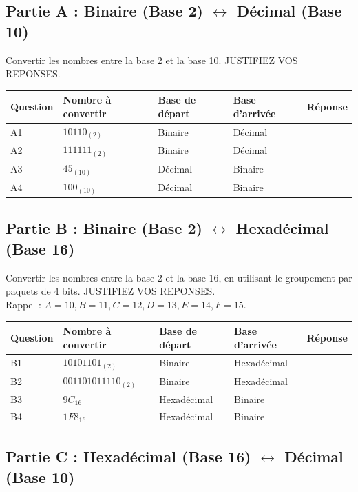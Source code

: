 \begin{Exercise}[title={Conversions de Bases Numériques}]
\subsection*{Partie A : Binaire (Base 2) $\leftrightarrow$ Décimal (Base 10)}
\Question Convertir les nombres entre la base 2 et la base 10. JUSTIFIEZ VOS REPONSES.\\[0.2cm]
\begin{tabular}{|l|l|l|l|l|}
    \hline
        Question & Nombre à convertir & Base de départ & Base d'arrivée & Réponse \\ \hline
        A1 & ${10110}_{(2)}$ & Binaire & Décimal & ~ \\ \hline
        A2 & ${111111}_{(2)}$ & Binaire & Décimal & ~ \\ \hline
        A3 & $45_{(10)}$ & Décimal & Binaire & ~ \\ \hline
        A4 & $100_{(10)}$ & Décimal & Binaire & ~ \\ \hline
\end{tabular}

%
\subsection*{Partie B : Binaire (Base 2) $\leftrightarrow$ Hexadécimal (Base 16)}

\Question Convertir les nombres entre la base 2 et la base 16, en utilisant le groupement par paquets de 4 bits. JUSTIFIEZ VOS REPONSES.\\

Rappel : $A=10, B=11, C=12, D=13, E=14, F=15$.\\

\begin{tabular}{|l|l|l|l|l|}
    \hline
        Question & Nombre à convertir & Base de départ & Base d'arrivée & Réponse \\ \hline
        B1 & ${10101101}_{(2)}$ & Binaire & Hexadécimal & ~ \\ \hline
        B2 & ${001101011110}_{(2)}$ & Binaire & Hexadécimal & ~ \\ \hline
        B3 & $9C_{16}$ & Hexadécimal & Binaire & ~ \\ \hline
        B4 & $1F8_{16}$ & Hexadécimal & Binaire & ~ \\ \hline
\end{tabular}


\subsection*{Partie C : Hexadécimal (Base 16) $\leftrightarrow$ Décimal (Base 10)}


\end{Exercise}
